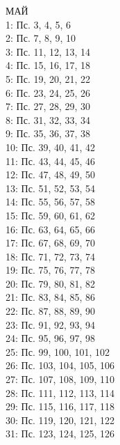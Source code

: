\documentclass[fontsize=16pt,letterpaper,DIV=6]{scrartcl}
\begin{document}
\begin{multicols}{2}
МАЙ
\\  1: Пс. 3, 4, 5, 6
\\  2: Пс. 7, 8, 9, 10
\\  3: Пс. 11, 12, 13, 14
\\  4: Пс. 15, 16, 17, 18
\\  5: Пс. 19, 20, 21, 22
\\  6: Пс. 23, 24, 25, 26
\\  7: Пс. 27, 28, 29, 30
\\  8: Пс. 31, 32, 33, 34
\\  9: Пс. 35, 36, 37, 38
\\  10: Пс. 39, 40, 41, 42
\\  11: Пс. 43, 44, 45, 46
\\  12: Пс. 47, 48, 49, 50
\\  13: Пс. 51, 52, 53, 54
\\  14: Пс. 55, 56, 57, 58
\\  15: Пс. 59, 60, 61, 62
\\  16: Пс. 63, 64, 65, 66
\\  17: Пс. 67, 68, 69, 70
\\  18: Пс. 71, 72, 73, 74
\\  19: Пс. 75, 76, 77, 78
\\  20: Пс. 79, 80, 81, 82
\\  21: Пс. 83, 84, 85, 86
\\  22: Пс. 87, 88, 89, 90
\\  23: Пс. 91, 92, 93, 94
\\  24: Пс. 95, 96, 97, 98
\\  25: Пс. 99, 100, 101, 102
\\  26: Пс. 103, 104, 105, 106
\\  27: Пс. 107, 108, 109, 110
\\  28: Пс. 111, 112, 113, 114
\\  29: Пс. 115, 116, 117, 118
\\  30: Пс. 119, 120, 121, 122
\\  31: Пс. 123, 124, 125, 126


\end{multicols}
\end{document}
